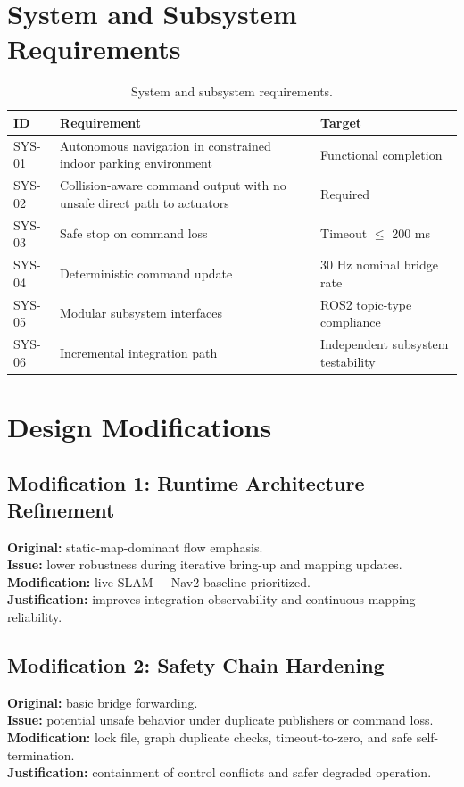 \documentclass[12pt,a4paper]{report}
\begin{document}
\section{System and Subsystem Requirements}
\begin{table}[H]
\centering
\caption{System and subsystem requirements.}
\label{tab:requirements}
\begin{tabularx}{\textwidth}{|p{1.8cm}|X|p{3cm}|}
\hline
\textbf{ID} & \textbf{Requirement} & \textbf{Target} \\
\hline
SYS-01 & Autonomous navigation in constrained indoor parking environment & Functional completion \\
\hline
SYS-02 & Collision-aware command output with no unsafe direct path to actuators & Required \\
\hline
SYS-03 & Safe stop on command loss & Timeout $\leq$ 200 ms \\
\hline
SYS-04 & Deterministic command update & 30 Hz nominal bridge rate \\
\hline
SYS-05 & Modular subsystem interfaces & ROS2 topic-type compliance \\
\hline
SYS-06 & Incremental integration path & Independent subsystem testability \\
\hline
\end{tabularx}
\end{table}

\section{Design Modifications}
\subsection{Modification 1: Runtime Architecture Refinement}
\textbf{Original:} static-map-dominant flow emphasis.\\
\textbf{Issue:} lower robustness during iterative bring-up and mapping updates.\\
\textbf{Modification:} live SLAM + Nav2 baseline prioritized.\\
\textbf{Justification:} improves integration observability and continuous mapping reliability.

\subsection{Modification 2: Safety Chain Hardening}
\textbf{Original:} basic bridge forwarding.\\
\textbf{Issue:} potential unsafe behavior under duplicate publishers or command loss.\\
\textbf{Modification:} lock file, graph duplicate checks, timeout-to-zero, and safe self-termination.\\
\textbf{Justification:} containment of control conflicts and safer degraded operation.
\end{document}
